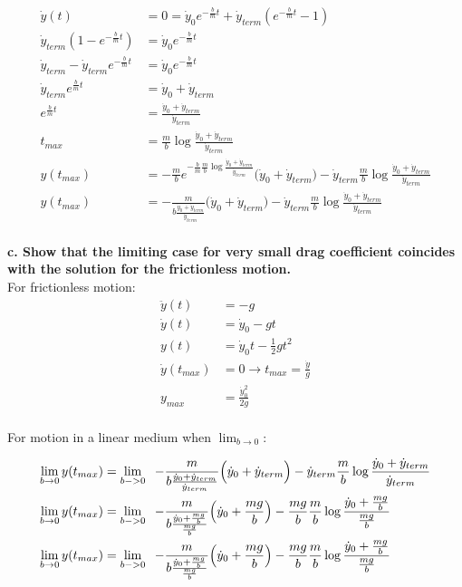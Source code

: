 \documentclass[10pt]{article} %
\begin{document}
\begin{align*}
  \dot{y}(t) &= 0 = \dot{y}_0e^{-\frac{b}{m}t} + \dot{y}_{term}(e^{-\frac{b}{m}t} - 1)\\
  \dot{y}_{term}(1 - e^{-\frac{b}{m}t}) &= \dot{y}_0e^{-\frac{b}{m}t}\\
  \dot{y}_{term} - \dot{y}_{term}e^{-\frac{b}{m}t} &= \dot{y}_0e^{-\frac{b}{m}t}\\
  \dot{y}_{term}e^{\frac{b}{m}t} &= \dot{y}_0 + \dot{y}_{term}\\
  e^{\frac{b}{m}t} &= \frac{\dot{y}_0 + \dot{y}_{term}}{\dot{y}_{term}}\\
  t_{max} &= \frac{m}{b}\log{\frac{\dot{y}_0 + \dot{y}_{term}}{\dot{y}_{term}}}\\
  y(t_{max}) &= -\frac{m}{b}e^{-\frac{b}{m}\frac{m}{b}\log{\frac{\dot{y}_0 + \dot{y}_{term}}{\dot{y}_{term}}}}\Big(\dot{y}_0 + \dot{y}_{term} \Big) - \dot{y}_{term}\frac{m}{b}\log{\frac{\dot{y}_0 + \dot{y}_{term}}{\dot{y}_{term}}}\\
    y(t_{max}) &= -\frac{m}{b\frac{\dot{y}_0 + \dot{y}_{term}}{\dot{y}_{term}}}\Big(\dot{y}_0 + \dot{y}_{term} \Big) - \dot{y}_{term}\frac{m}{b}\log{\frac{\dot{y}_0 + \dot{y}_{term}}{\dot{y}_{term}}}\\
\end{align*}


\textbf{c. Show that the limiting case for very small drag coefficient coincides with the solution for the frictionless motion.}\\
For frictionless motion:
\begin{align*}
  \ddot{y}(t) &= -g\\
  \dot{y}(t) &= \dot{y}_0 - gt\\
  y(t) &= \dot{y}_0t - \frac{1}{2}gt^2\\
  \dot{y}(t_{max}) &= 0 \rightarrow t_{max} = \frac{\dot{y}}{g}\\
  y_{max} &= \frac{\dot{y}_0^2}{2g}\\
\end{align*}

For motion in a linear medium when $\lim_{b\rightarrow0}$:

\begin{align*}
  \lim_{b\rightarrow0}y(t_{max}) &= \lim_{b->0} \hspace{0.2cm} -\frac{m}{b\frac{\dot{y}_0 + \dot{y}_{term}}{\dot{y}_{term}}}\Big(\dot{y}_0 + \dot{y}_{term} \Big) - \dot{y}_{term}\frac{m}{b}\log{\frac{\dot{y}_0 + \dot{y}_{term}}{\dot{y}_{term}}}\\
  \lim_{b\rightarrow0}y(t_{max}) &= \lim_{b->0} \hspace{0.2cm} -\frac{m}{b\frac{\dot{y}_0 + \frac{mg}{b}}{\frac{mg}{b}}}\Big(\dot{y}_0 + \frac{mg}{b} \Big) - \frac{mg}{b}\frac{m}{b}\log{\frac{\dot{y}_0 + \frac{mg}{b}}{\frac{mg}{b}}}\\
  \lim_{b\rightarrow0}y(t_{max}) &= \lim_{b->0} \hspace{0.2cm} -\frac{m}{b\frac{\dot{y}_0 + \frac{mg}{b}}{\frac{mg}{b}}}\Big(\dot{y}_0 + \frac{mg}{b} \Big) - \frac{mg}{b}\frac{m}{b}\log{\frac{\dot{y}_0 + \frac{mg}{b}}{\frac{mg}{b}}}\\
\end{align*}
\end{document}
